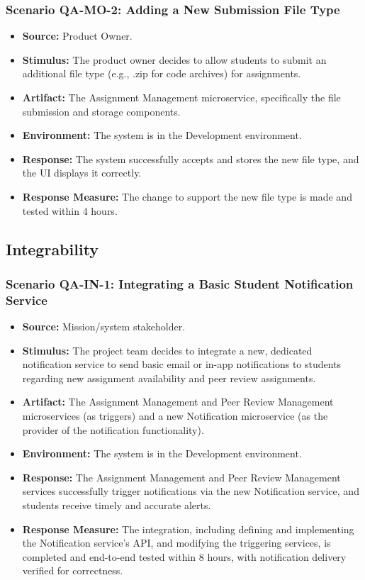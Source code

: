 \subsubsection{Scenario QA-MO-2: Adding a New Submission File Type}
\begin{itemize}
    \item \textbf{Source:} Product Owner.
    \item \textbf{Stimulus:} The product owner decides to allow students to submit an additional file type (e.g., .zip for code archives) for assignments.
    \item \textbf{Artifact:} The Assignment Management microservice, specifically the file submission and storage components.
    \item \textbf{Environment:} The system is in the Development environment.
    \item \textbf{Response:} The system successfully accepts and stores the new file type, and the UI displays it correctly.
    \item \textbf{Response Measure:} The change to support the new file type is made and tested within 4 hours.
\end{itemize}

\subsection{Integrability}

\subsubsection{Scenario QA-IN-1: Integrating a Basic Student Notification Service}
\begin{itemize}
    \item \textbf{Source:} Mission/system stakeholder.
    \item \textbf{Stimulus:} The project team decides to integrate a new, dedicated notification service to send basic email or in-app notifications to students regarding new assignment availability and peer review assignments.
    \item \textbf{Artifact:} The Assignment Management and Peer Review Management microservices (as triggers) and a new Notification microservice (as the provider of the notification functionality).
    \item \textbf{Environment:} The system is in the Development environment.
    \item \textbf{Response:} The Assignment Management and Peer Review Management services successfully trigger notifications via the new Notification service, and students receive timely and accurate alerts.
    \item \textbf{Response Measure:} The integration, including defining and implementing the Notification service's API, and modifying the triggering services, is completed and end-to-end tested within 8 hours, with notification delivery verified for correctness.
\end{itemize}

